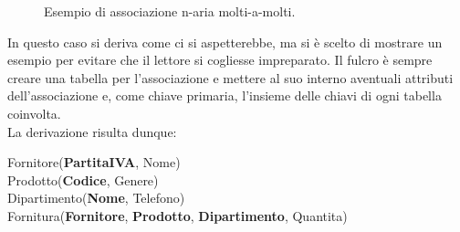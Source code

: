 \documentclass[12pt]{report}
\begin{document}
\begin{figure}[htbp]
{
		}	
		\caption{Esempio di associazione n-aria molti-a-molti.}
	\end{figure}
	
	In questo caso si deriva come ci si aspetterebbe, ma si è scelto di mostrare un esempio per evitare che il lettore si cogliesse impreparato. Il fulcro è sempre creare una tabella per l'associazione e mettere al suo interno aventuali attributi dell'associazione e, come chiave primaria, l'insieme delle chiavi di ogni tabella coinvolta.\\
	La derivazione risulta dunque:
	\begin{center}
		Fornitore(\textbf{PartitaIVA}, Nome)\\
		Prodotto(\textbf{Codice}, Genere)\\
		Dipartimento(\textbf{Nome}, Telefono)\\
		Fornitura(\textbf{Fornitore}, \textbf{Prodotto}, \textbf{Dipartimento}, Quantita)
	\end{center}
	
\end{document}

